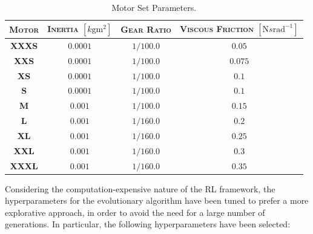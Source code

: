 \begin{table}[h]
    \centering
    \begin{tabular}{c c c c}
        \toprule
        \textsc{Motor} & \textsc{Inertia} $[k\mathrm{gm}^2]$ & \textsc{Gear Ratio} & \textsc{Viscous Friction} $[\mathrm{N}s\mathrm{rad}^{-1}]$ \\
        \midrule
        \textbf{XXXS}  & $0.0001$                            & $1/100.0$           & $0.05$                                                     \\
        \textbf{XXS}   & $0.0001$                            & $1/100.0$           & $0.075$                                                    \\
        \textbf{XS}    & $0.0001$                            & $1/100.0$           & $0.1$                                                      \\
        \textbf{S}     & $0.0001$                            & $1/100.0$           & $0.1$                                                      \\
        \textbf{M}     & $0.001$                             & $1/100.0$           & $0.15$                                                     \\
        \textbf{L}     & $0.001$                             & $1/160.0$           & $0.2$                                                      \\
        \textbf{XL}    & $0.001$                             & $1/160.0$           & $0.25$                                                     \\
        \textbf{XXL}   & $0.001$                             & $1/160.0$           & $0.3$                                                      \\
        \textbf{XXXL}  & $0.001$                             & $1/160.0$           & $0.35$                                                     \\
        \bottomrule
    \end{tabular}
    \caption{Motor Set Parameters.}
    \label{tab:motorparams}
\end{table}


Considering the computation-expensive nature of the \ac{RL} framework, the hyperparameters for the evolutionary algorithm have been tuned to prefer a more explorative approach, in order to avoid the need for a large number of generations. In particular, the following hyperparameters have been selected:

